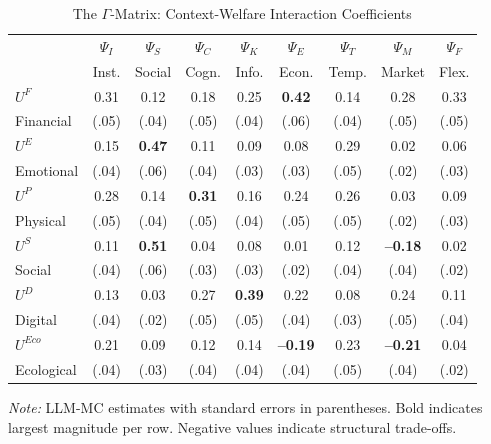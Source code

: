 \begin{table}[htbp]
\centering
\caption{The $\Gamma$-Matrix: Context-Welfare Interaction Coefficients}
\label{tab:app-c-gamma-full}
\small
\renewcommand{\arraystretch}{1.4}
\begin{tabular}{@{}lcccccccc@{}}
\toprule
& $\Psi_I$ & $\Psi_S$ & $\Psi_C$ & $\Psi_K$ & $\Psi_E$ & $\Psi_T$ & $\Psi_M$ & $\Psi_F$ \\
& \scriptsize{Inst.} & \scriptsize{Social} & \scriptsize{Cogn.} & \scriptsize{Info.} & \scriptsize{Econ.} & \scriptsize{Temp.} & \scriptsize{Market} & \scriptsize{Flex.} \\
\midrule
$U^F$ & 0.31 & 0.12 & 0.18 & 0.25 & \textbf{0.42} & 0.14 & 0.28 & 0.33 \\
\scriptsize{Financial} & \scriptsize{(.05)} & \scriptsize{(.04)} & \scriptsize{(.05)} & \scriptsize{(.04)} & \scriptsize{(.06)} & \scriptsize{(.04)} & \scriptsize{(.05)} & \scriptsize{(.05)} \\
\addlinespace
$U^E$ & 0.15 & \textbf{0.47} & 0.11 & 0.09 & 0.08 & 0.29 & 0.02 & 0.06 \\
\scriptsize{Emotional} & \scriptsize{(.04)} & \scriptsize{(.06)} & \scriptsize{(.04)} & \scriptsize{(.03)} & \scriptsize{(.03)} & \scriptsize{(.05)} & \scriptsize{(.02)} & \scriptsize{(.03)} \\
\addlinespace
$U^P$ & 0.28 & 0.14 & \textbf{0.31} & 0.16 & 0.24 & 0.26 & 0.03 & 0.09 \\
\scriptsize{Physical} & \scriptsize{(.05)} & \scriptsize{(.04)} & \scriptsize{(.05)} & \scriptsize{(.04)} & \scriptsize{(.05)} & \scriptsize{(.05)} & \scriptsize{(.02)} & \scriptsize{(.03)} \\
\addlinespace
$U^S$ & 0.11 & \textbf{0.51} & 0.04 & 0.08 & 0.01 & 0.12 & \textbf{--0.18} & 0.02 \\
\scriptsize{Social} & \scriptsize{(.04)} & \scriptsize{(.06)} & \scriptsize{(.03)} & \scriptsize{(.03)} & \scriptsize{(.02)} & \scriptsize{(.04)} & \scriptsize{(.04)} & \scriptsize{(.02)} \\
\addlinespace
$U^D$ & 0.13 & 0.03 & 0.27 & \textbf{0.39} & 0.22 & 0.08 & 0.24 & 0.11 \\
\scriptsize{Digital} & \scriptsize{(.04)} & \scriptsize{(.02)} & \scriptsize{(.05)} & \scriptsize{(.05)} & \scriptsize{(.04)} & \scriptsize{(.03)} & \scriptsize{(.05)} & \scriptsize{(.04)} \\
\addlinespace
$U^{Eco}$ & 0.21 & 0.09 & 0.12 & 0.14 & \textbf{--0.19} & 0.23 & \textbf{--0.21} & 0.04 \\
\scriptsize{Ecological} & \scriptsize{(.04)} & \scriptsize{(.03)} & \scriptsize{(.04)} & \scriptsize{(.04)} & \scriptsize{(.04)} & \scriptsize{(.05)} & \scriptsize{(.04)} & \scriptsize{(.02)} \\
\bottomrule
\end{tabular}
\begin{flushleft}
\small\textit{Note:} LLM-MC estimates with standard errors in parentheses. 
Bold indicates largest magnitude per row. Negative values indicate structural trade-offs.
\end{flushleft}
\end{table}

